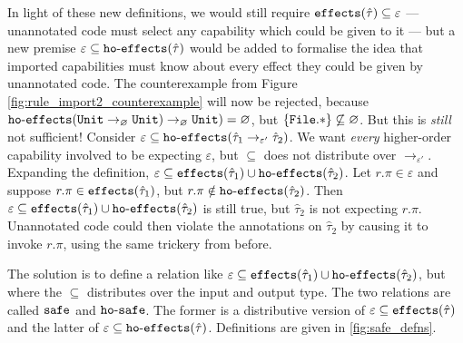 In light of these new definitions, we would still require $\mathtt{effects}(\hat \tau) \subseteq \varepsilon$ --- unannotated code must select any capability which could be given to it --- but a new premise $\varepsilon \subseteq \mathtt{ho \hbox{-} effects}(\hat \tau)$ would be added to formalise the idea that imported capabilities must know about every effect they could be given by unannotated code.  The counterexample from Figure \ref{fig:rule_import2_counterexample} will now be rejected, because $\mathtt{ho \hbox{-} effects}(\mathtt{Unit} \rightarrow_{\varnothing} \mathtt{Unit}) \rightarrow_{\varnothing} \mathtt{Unit}) = \varnothing$, but $\{ \mathtt{File.*} \} \not\subseteq \varnothing$. But this is \textit{still} not sufficient! Consider $\varepsilon \subseteq \mathtt{ho \hbox{-} effects}( \hat \tau_1 \rightarrow_{\varepsilon'} \hat \tau_2 )$. We want \textit{every} higher-order capability involved to be expecting $\varepsilon$, but $\subseteq$ does not distribute over $\rightarrow_{\varepsilon'}$. Expanding the definition, $\varepsilon \subseteq \mathtt{effects}(\hat \tau_1) \cup \mathtt{ho \hbox{-} effects}(\hat \tau_2)$. Let $r.\pi \in \varepsilon$ and suppose $r.\pi \in \mathtt{effects}(\hat \tau_1)$, but $r.\pi \notin \mathtt{ho \hbox{-} effects}(\hat \tau_2)$. Then $\varepsilon \subseteq \mathtt{effects}(\hat \tau_1) \cup \mathtt{ho \hbox{-} effects}(\hat \tau_2)$ is still true, but $\hat \tau_2$ is not expecting $r.\pi$. Unannotated code could then violate the annotations on $\hat \tau_2$ by causing it to invoke $r.\pi$, using the same trickery from before.

The solution is to define a relation like $\varepsilon \subseteq \mathtt{effects}(\hat \tau_1) \cup \mathtt{ho \hbox{-} effects}(\hat \tau_2)$, but where the $\subseteq$ distributes over the input and output type. The two relations are called $\mathtt{safe}$ and $\mathtt{ho \hbox{-} safe}$. The former is a distributive version of $\varepsilon \subseteq \mathtt{effects}(\hat \tau)$ and the latter of $\varepsilon \subseteq \mathtt{ho \hbox{-} effects}(\hat \tau)$. Definitions are given in \ref{fig:safe_defns}.


